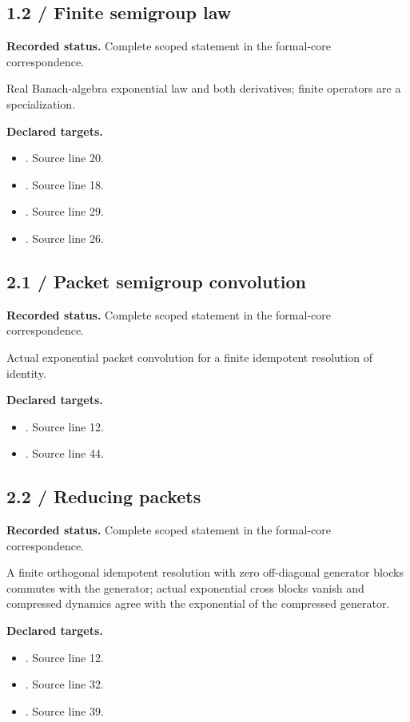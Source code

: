\subsection{1.2 / Finite semigroup law}
\label{result:1.2}
\textbf{Recorded status.} Complete scoped statement in the formal-core correspondence.\par
Real Banach-algebra exponential law and both derivatives; finite operators are a specialization.

\textbf{Declared targets.}\begin{itemize}
\item {}. Source line 20.
\item {}. Source line 18.
\item {}. Source line 29.
\item {}. Source line 26.
\end{itemize}
\subsection{2.1 / Packet semigroup convolution}
\label{result:2.1}
\textbf{Recorded status.} Complete scoped statement in the formal-core correspondence.\par
Actual exponential packet convolution for a finite idempotent resolution of identity.

\textbf{Declared targets.}\begin{itemize}
\item {}. Source line 12.
\item {}. Source line 44.
\end{itemize}
\subsection{2.2 / Reducing packets}
\label{result:2.2}
\textbf{Recorded status.} Complete scoped statement in the formal-core correspondence.\par
A finite orthogonal idempotent resolution with zero off-diagonal generator blocks commutes with the generator; actual exponential cross blocks vanish and compressed dynamics agree with the exponential of the compressed generator.

\textbf{Declared targets.}\begin{itemize}
\item {}. Source line 12.
\item {}. Source line 32.
\item {}. Source line 39.
\end{itemize}
